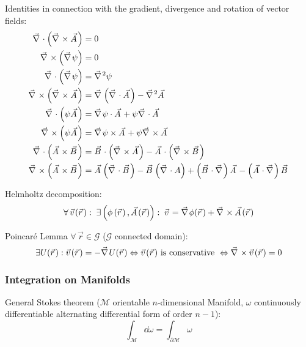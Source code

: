 			\noindent
			Identities in connection with the gradient, divergence and rotation of vector fields:
			\begin{equation}
				\begin{aligned}
					\Nabla\cdot\left(\Nabla\times\vec{A}\right) &= 0 \\
					\Nabla\times\left(\Nabla\psi\right) &= 0 \\
					\Nabla\cdot\left(\Nabla\psi\right) &= \Nabla^2\psi \\
					\Nabla\times\left(\Nabla\times\vec{A}\right) &= \Nabla\left(\Nabla\cdot\vec{A}\right) -\Nabla^2\vec{A} \\
					\Nabla\cdot\left(\psi\vec{A}\right) &= \Nabla\psi\cdot\vec{A} + \psi\Nabla\cdot\vec{A}\\
					\Nabla\times\left(\psi\vec{A}\right) &= \Nabla\psi\times\vec{A} + \psi\Nabla\times\vec{A} \\
					\Nabla\cdot\left(\vec{A}\times\vec{B}\right) &= \vec{B}\cdot\left(\Nabla\times\vec{A}\right) - 	\vec{A}\cdot\left(\Nabla\times\vec{B}\right) \\
					\Nabla\times\left(\vec{A}\times\vec{B}\right) &= \vec{A}\left(\Nabla\cdot\vec{B}\right) - \vec{B}\left(\Nabla\cdot{A}\right) + \left(\vec{B}\cdot\Nabla\right)\vec{A} - \left(\vec{A}\cdot\Nabla\right)\vec{B} \\
				\end{aligned}
			\end{equation}

			\noindent
			Helmholtz decomposition:
			\begin{equation}
				\forall \,\vec{v}(\vec{r}):\; \exists\left(\phi\left(\vec{r}\right),\vec{A}(\vec{r})\right):\;\vec{v} = \Nabla\phi(\vec{r}) + 	\Nabla\times\vec{A}(\vec{r})
			\end{equation}

			\noindent
			Poincaré Lemma $\forall\, \vec{r}\in\mathcal{G}$ ($\mathcal{G}$ connected domain):
			\begin{equation}
				\exists U(\vec{r}): \vec{v}(\vec{r}) = -\Nabla U(\vec{r})
				\Leftrightarrow \vec{v}(\vec{r}) \text{ is conservative }
				\Leftrightarrow \Nabla\times\vec{v}(\vec{r}) = 0
			\end{equation}

		\subsubsection{Integration on Manifolds}
			\noindent
			General Stokes theorem ($\mathcal{M}$ orientable $n$-dimensional Manifold, $\omega$ continuously differentiable alternating differential form of order $n-1$):
			\begin{equation}
				\int_\mathcal{M} \dd \omega = \int_{\partial\mathcal{M}} \omega
			\end{equation}

